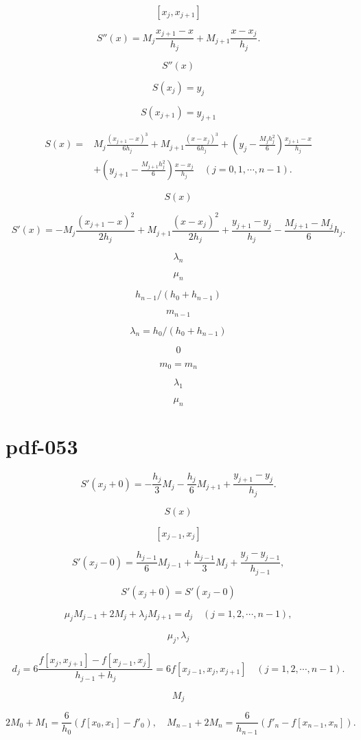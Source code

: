 \documentclass[fontset=fandol]{ctexart}
\begin{document}
\[[x_j,x_{j+1}]\]

\[S''(x)=M_j\frac{x_{j+1}-x}{h_j}+M_{j+1}\frac{x-x_j}{h_j}.\tag{2.8.16}\]

\[S''(x)\]

\[S(x_j)=y_j\]

\[S(x_{j+1})=y_{j+1}\]

\[\begin{aligned}
S(x)={}&M_j\frac{(x_{j+1}-x)^3}{6h_j}+M_{j+1}\frac{(x-x_j)^3}{6h_j}+\left(y_j-\frac{M_jh_j^2}6\right)\frac{x_{j+1}-x}{h_j}\\
&+\left(y_{j+1}-\frac{M_{j+1}h_j^2}6\right)\frac{x-x_j}{h_j}\quad(j=0,1,\cdots,n-1).
\end{aligned}\tag{2.8.17}\]

\[S(x)\]

\[S'(x)=-M_j\frac{(x_{j+1}-x)^2}{2h_j}+M_{j+1}\frac{(x-x_j)^2}{2h_j}+\frac{y_{j+1}-y_j}{h_j}-\frac{M_{j+1}-M_j}6h_j.\tag{2.8.18}\]

\[\lambda_n\]

\[\mu_n\]

\[h_{n-1}/(h_0+h_{n-1})\]

\[m_{n-1}\]

\[\lambda_n=h_0/(h_0+h_{n-1})\]

\[0\]

\[m_0=m_n\]

\[\lambda_1\]

\[\mu_n\]

\section*{pdf-053}

\[S'(x_j+0)=-\frac{h_j}3M_j-\frac{h_j}6M_{j+1}+\frac{y_{j+1}-y_j}{h_j}.\]

\[S(x)\]

\[[x_{j-1},x_j]\]

\[S'(x_j-0)=\frac{h_{j-1}}6M_{j-1}+\frac{h_{j-1}}3M_j+\frac{y_j-y_{j-1}}{h_{j-1}},\]

\[S'(x_j+0)=S'(x_j-0)\]

\[\mu_jM_{j-1}+2M_j+\lambda_jM_{j+1}=d_j\quad(j=1,2,\cdots,n-1),\tag{2.8.19}\]

\[\mu_j,\lambda_j\]

\[d_j=6\frac{f[x_j,x_{j+1}]-f[x_{j-1},x_j]}{h_{j-1}+h_j}=6f[x_{j-1},x_j,x_{j+1}]\quad(j=1,2,\cdots,n-1).\tag{2.8.20}\]

\[M_j\]

\[2M_0+M_1=\frac6{h_0}(f[x_0,x_1]-f'_0),\quad M_{n-1}+2M_n=\frac6{h_{n-1}}(f'_n-f[x_{n-1},x_n]).\]
\end{document}
